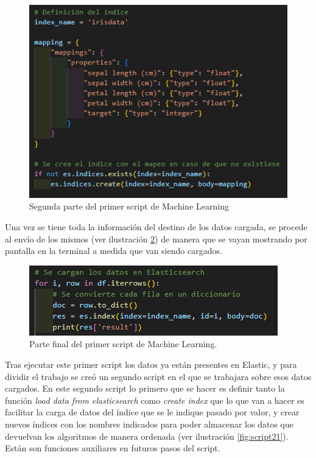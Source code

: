 \begin{figure}
    \centering
    \includegraphics[width=1\linewidth]{img/iris2.png}
    \caption{Segunda parte del primer script de Machine Learning}
    \label{fig:script12}
\end{figure}

Una vez se tiene toda la información del destino de los datos cargada, se procede al envío de los mismos  (ver ilustración  \ref{fig:script13}) de manera que se vayan mostrando por pantalla en la terminal a medida que van siendo cargados.

\begin{figure}
    \centering
    \includegraphics[width=1\linewidth]{img/iris3.png}
    \caption{Parte final del primer script de Machine Learning.}
    \label{fig:script13}
\end{figure}


Tras ejecutar este primer script los datos ya están presentes en Elastic, y para dividir el trabajo se creó un segundo script en el que se trabajara sobre esos datos cargados. En este segundo script lo primero que se hacer es definir tanto la función \textit{load data from elasticsearch} como \textit{create index} que lo que van a hacer es facilitar la carga de datos del índice que se le indique pasado por valor, y crear nuevos índices con los nombres indicados para poder almacenar los datos que devuelvan los algoritmos de manera ordenada  (ver ilustración  \ref{fig:script21}). Están son funciones auxiliares en futuros pasos del script.


